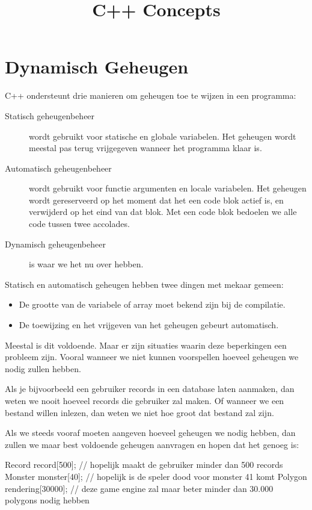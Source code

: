\documentclass[11pt, oldfontcommands, oneside, a4paper]{memoir}
\title{C++ Concepts}
\begin{document}
\titleGM
\tableofcontents

\chapter{Dynamisch Geheugen}
C++ ondersteunt drie manieren om geheugen toe te wijzen in een programma:

\begin{description}
	\item[Statisch geheugenbeheer] wordt gebruikt voor statische en globale variabelen. Het geheugen wordt meestal pas terug vrijgegeven wanneer het programma klaar is.
	\item[Automatisch geheugenbeheer] wordt gebruikt voor functie argumenten en locale variabelen. Het geheugen wordt gereserveerd op het moment dat het een code blok actief is, en verwijderd op het eind van dat blok. Met een code blok bedoelen we alle code tussen twee accolades.
	\item[Dynamisch geheugenbeheer] is waar we het nu over hebben.
\end{description}

Statisch en automatisch geheugen hebben twee dingen met mekaar gemeen:

\begin{itemize}
	\item De grootte van de variabele of array moet bekend zijn bij de compilatie.
	\item De toewijzing en het vrijgeven van het geheugen gebeurt automatisch.
\end{itemize}

Meestal is dit voldoende. Maar er zijn situaties waarin deze beperkingen een probleem zijn. Vooral wanneer we niet kunnen voorspellen hoeveel geheugen we nodig zullen hebben.

Als je bijvoorbeeld een gebruiker records in een database laten aanmaken, dan weten we nooit hoeveel records die gebruiker zal maken. Of wanneer we een bestand willen inlezen, dan weten we niet hoe groot dat bestand zal zijn.

Als we steeds vooraf moeten aangeven hoeveel geheugen we nodig hebben, dan zullen we maar best voldoende geheugen aanvragen en hopen dat het genoeg is:

\begin{code}
Record record[500]; // hopelijk maakt de gebruiker minder dan 500 records
Monster monster[40]; // hopelijk is de speler dood voor monster 41 komt
Polygon rendering[30000]; // deze game engine zal maar beter minder dan 30.000 polygons nodig hebben
\end{code}
\end{document}

